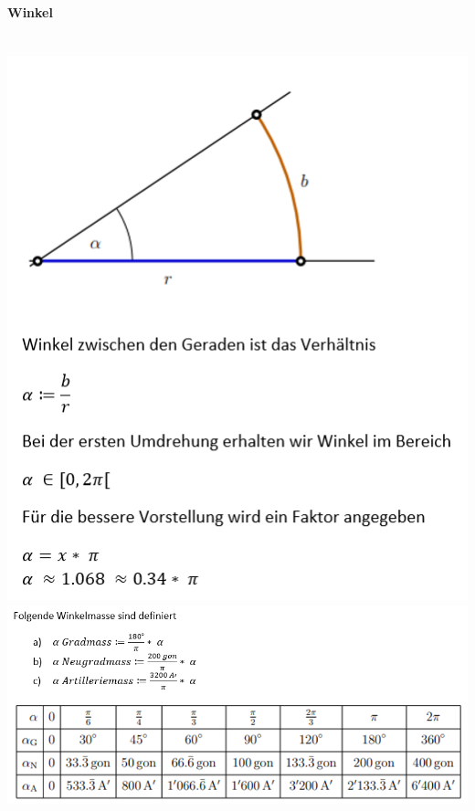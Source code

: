 \paragraph{Winkel}\mbox{}\\
\noindent
\includegraphics[width=\columnwidth]{./images/winkel.png}
\includegraphics[width=\columnwidth]{./images/winkel1.png}
\vspace{1mm}

